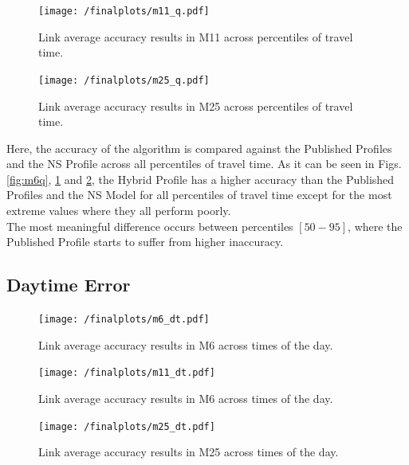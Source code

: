\documentclass[conference, letterpaper]{IEEEtran}
\begin{document}
\begin{figure}[htbp]
	\centering
	\texttt{[image: /finalplots/m11\_q.pdf]}
	\caption{Link average accuracy results in M11 across percentiles of travel time.}
	\label{fig:m11q}
\end{figure}

\begin{figure}[htbp]
	\centering
	\texttt{[image: /finalplots/m25\_q.pdf]}
	\caption{Link average accuracy results in M25 across percentiles of travel time.}
	\label{fig:m25q}
\end{figure}
Here, the accuracy of the algorithm is compared against the Published Profiles and the NS Profile across all percentiles of travel time.
As it can be seen in Figs. \ref{fig:m6q}, \ref{fig:m11q} and \ref{fig:m25q}, the Hybrid Profile has a higher accuracy than the Published Profiles and the NS Model for all percentiles of travel time except for the most extreme values where they all perform poorly.\\
The most meaningful difference occurs between percentiles $[50-95]$, where the Published Profile starts to suffer from higher inaccuracy.

\subsection{Daytime Error}
\begin{figure}[htbp]
	\centering
		\texttt{[image: /finalplots/m6\_dt.pdf]}
	\caption{Link average accuracy results in M6 across times of the day.}
	\label{fig:m6daytime}
\end{figure}

\begin{figure}[htbp]
	\centering
	\texttt{[image: /finalplots/m11\_dt.pdf]}
	\caption{Link average accuracy results in M6 across times of the day.}
	\label{fig:m11daytime}
\end{figure}

\begin{figure}[htbp]
	\centering
	\texttt{[image: /finalplots/m25\_dt.pdf]}
	\caption{Link average accuracy results in M25 across times of the day.}
	\label{fig:m25daytime}
\end{figure}
\end{document}
